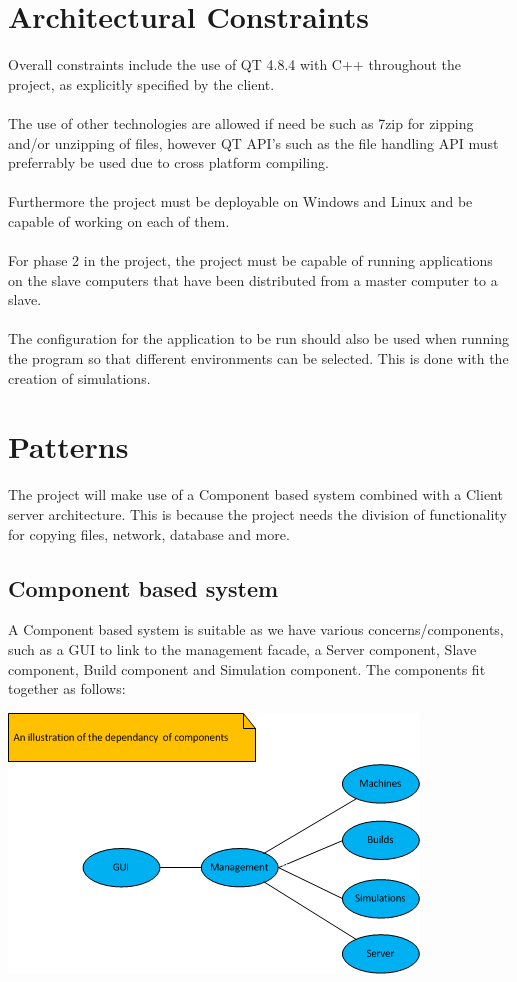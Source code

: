 \documentclass[a4paper,12pt,final]{article}
\begin{document}
\section{Architectural Constraints}
Overall constraints include the use of QT 4.8.4 with C++ throughout the project, as explicitly specified by the client.\\\textbf{\\}
The use of other technologies are allowed if need be such as 7zip for zipping and/or unzipping of files, however QT API's such as the file handling API must preferrably be used due to cross platform compiling.\\\textbf{\\}
Furthermore the project must be deployable on Windows and Linux and be capable of working on each of them.\\\textbf{\\}
For phase 2 in the project, the project must be capable of running applications on the slave computers that have been distributed from a master computer to a slave.\\\textbf{\\}
The configuration for the application to be run should also be used when running the program so that different environments can be selected. This is done with the creation of simulations.

\section{Patterns}
The project will make use of a Component based system combined with a Client server architecture. This is because the project needs the division of functionality for copying files, network, database and more.
\subsection{Component based system}
A Component based system is suitable as we have various concerns/components, such as a GUI to link to the management facade, a Server component, Slave component, Build component and Simulation component. The components fit together as follows:
\begin{center}
  \includegraphics[scale=1]{ArchComponentDiag.png}
\end{center}
\end{document}
